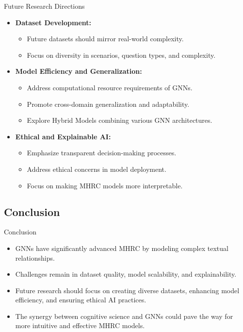\documentclass[10pt]{beamer}
\begin{document}
\begin{frame}{Future Research Directions}
  \begin{itemize}
    \item \textbf{Dataset Development:}
      \begin{itemize}
        \item Future datasets should mirror real-world complexity.
        \item Focus on diversity in scenarios, question types, and complexity.
      \end{itemize}
    \item \textbf{Model Efficiency and Generalization:}
      \begin{itemize}
        \item Address computational resource requirements of GNNs.
        \item Promote cross-domain generalization and adaptability.
        \item Explore Hybrid Models combining various GNN architectures.
      \end{itemize}
    \item \textbf{Ethical and Explainable AI:}
      \begin{itemize}
        \item Emphasize transparent decision-making processes.
        \item Address ethical concerns in model deployment.
        \item Focus on making MHRC models more interpretable.
      \end{itemize}
  \end{itemize}
\end{frame}

\subsection{Conclusion}

\begin{frame}{Conclusion}
  \begin{itemize}
    \item GNNs have significantly advanced MHRC by modeling complex textual relationships.
    \item Challenges remain in dataset quality, model scalability, and explainability.
    \item Future research should focus on creating diverse datasets, enhancing model efficiency, and ensuring ethical AI practices.
    \item The synergy between cognitive science and GNNs could pave the way for more intuitive and effective MHRC models.
  \end{itemize}
\end{frame}
\end{document}
